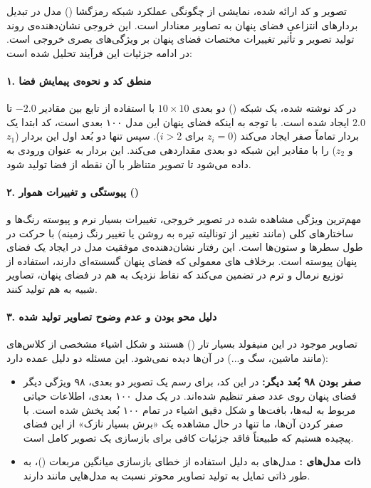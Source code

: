 \documentclass{article}
\begin{document}
تصویر و کد ارائه شده، نمایشی از چگونگی عملکرد شبکه رمزگشا () مدل  در تبدیل بردارهای انتزاعی فضای پنهان به تصاویر معنادار است. این خروجی نشان‌دهنده‌ی روند تولید تصویر و تأثیر تغییرات مختصات فضای پنهان بر ویژگی‌های بصری خروجی است. در ادامه جزئیات این فرآیند تحلیل شده است:

\paragraph{۱. منطق کد و نحوه‌ی پیمایش فضا}
در کد نوشته شده، یک شبکه () دو بعدی $10 \times 10$ با استفاده از تابع  بین مقادیر $-2.0$ تا $2.0$ ایجاد شده است. با توجه به اینکه فضای پنهان این مدل ۱۰۰ بعدی است، کد ابتدا یک بردار تماماً صفر ایجاد می‌کند ($z_i = 0$ برای $i > 2$). سپس تنها دو بُعد اول این بردار ($z_1$ و $z_2$) را با مقادیر این شبکه دو بعدی مقداردهی می‌کند. این بردار به عنوان ورودی به  داده می‌شود تا تصویر متناظر با آن نقطه از فضا تولید شود.

\paragraph{۲. پیوستگی و تغییرات هموار ()}
مهم‌ترین ویژگی مشاهده شده در تصویر خروجی، تغییرات بسیار نرم و پیوسته رنگ‌ها و ساختارهای کلی (مانند تغییر از تونالیته تیره به روشن یا تغییر رنگ زمینه) با حرکت در طول سطرها و ستون‌ها است. این رفتار نشان‌دهنده‌ی موفقیت مدل  در ایجاد یک فضای پنهان پیوسته است. برخلاف های معمولی که فضای پنهان گسسته‌ای دارند، استفاده از توزیع نرمال و ترم  در  تضمین می‌کند که نقاط نزدیک به هم در فضای پنهان، تصاویر شبیه به هم تولید کنند.

\paragraph{۳. دلیل محو بودن و عدم وضوح تصاویر تولید شده}
تصاویر موجود در این منیفولد بسیار تار () هستند و شکل اشیاء مشخصی از کلاس‌های  (مانند ماشین، سگ و...) در آن‌ها دیده نمی‌شود. این مسئله دو دلیل عمده دارد:
\begin{itemize}
	\item \textbf{صفر بودن ۹۸ بُعد دیگر:} در این کد، برای رسم یک تصویر دو بعدی، ۹۸ ویژگی دیگر فضای پنهان روی عدد صفر تنظیم شده‌اند. در یک مدل ۱۰۰ بعدی، اطلاعات حیاتی مربوط به لبه‌ها، بافت‌ها و شکل دقیق اشیاء در تمام ۱۰۰ بُعد پخش شده است. با صفر کردن آن‌ها، ما تنها در حال مشاهده یک «برش بسیار نازک» از این فضای پیچیده هستیم که طبیعتاً فاقد جزئیات کافی برای بازسازی یک تصویر کامل است.
	\item \textbf{ذات مدل‌های :} مدل‌های  به دلیل استفاده از خطای بازسازی میانگین مربعات ()، به طور ذاتی تمایل به تولید تصاویر محوتر نسبت به مدل‌هایی مانند  دارند.
\end{itemize}
\end{document}
